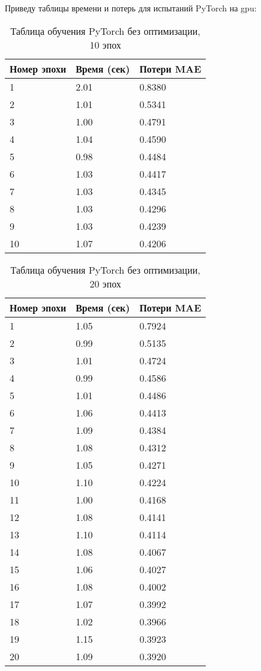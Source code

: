\documentclass[a4paper,12pt,titlepage,final]{article}
\begin{document}
Приведу таблицы времени и потерь для испытаний PyTorch на gpu:

\begin{table}[H]
\centering
\begin{tabular}{|p{5.4cm}|p{3.8cm}|p{3.8cm}|}
\hline
Номер эпохи & Время (сек) & Потери MAE \\
\hline
1 & 2.01 & 0.8380 \\ [1.5ex]
\hline
2 & 1.01 & 0.5341 \\ [1.5ex]
\hline
3 & 1.00 & 0.4791 \\ [1.5ex]
\hline
4 & 1.04 & 0.4590 \\ [1.5ex]
\hline
5 & 0.98 & 0.4484 \\ [1.5ex]
\hline
6 & 1.03 & 0.4417 \\ [1.5ex]
\hline
7 & 1.03 & 0.4345 \\ [1.5ex]
\hline
8 & 1.03 & 0.4296 \\ [1.5ex]
\hline
9 & 1.03 & 0.4239 \\ [1.5ex]
\hline
10 & 1.07 & 0.4206 \\ [1.5ex]
\hline
\end{tabular}
\caption{Таблица обучения PyTorch без оптимизации, 10 эпох}
\label{gputable7}
\end{table}

\begin{table}[H]
\centering
\begin{tabular}{|p{6.4cm}|p{3.2cm}|p{3.2cm}|}
\hline
Номер эпохи & Время (сек) & Потери MAE \\
\hline
1 & 1.05 & 0.7924 \\ [1.5ex]
\hline
2 & 0.99 & 0.5135 \\ [1.5ex]
\hline
3 & 1.01 & 0.4724 \\ [1.5ex]
\hline
4 & 0.99 & 0.4586 \\ [1.5ex]
\hline
5 & 1.01 & 0.4486 \\ [1.5ex]
\hline
6 & 1.06 & 0.4413 \\ [1.5ex]
\hline
7 & 1.09 & 0.4384 \\ [1.5ex]
\hline
8 & 1.08 & 0.4312 \\ [1.5ex]
\hline
9 & 1.05 & 0.4271 \\ [1.5ex]
\hline
10 & 1.10 & 0.4224 \\ [1.5ex]
\hline
11 & 1.00 & 0.4168 \\ [1.5ex]
\hline
12 & 1.08 & 0.4141 \\ [1.5ex]
\hline
13 & 1.10 & 0.4114 \\ [1.5ex]
\hline
14 & 1.08 & 0.4067 \\ [1.5ex]
\hline
15 & 1.06 & 0.4027 \\ [1.5ex]
\hline
16 & 1.08 & 0.4002 \\ [1.5ex]
\hline
17 & 1.07 & 0.3992 \\ [1.5ex]
\hline
18 & 1.02 & 0.3966 \\ [1.5ex]
\hline
19 & 1.15 & 0.3923 \\ [1.5ex]
\hline
20 & 1.09 & 0.3920 \\ [1.5ex]
\hline
\end{tabular}
\caption{Таблица обучения PyTorch без оптимизации, 20 эпох}
\label{gputable8}
\end{table}
\end{document}
